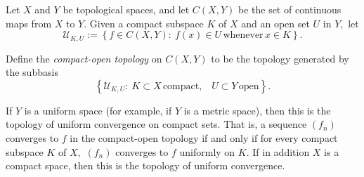\documentclass[12pt]{article}
\newcommand{\set}[1]{\left\{#1\right\}}
\newcommand{\seq}[1]{\left(#1\right)}
\begin{document}
\newcommand{\fU}{{\mathcal U}}
Let $X$ and $Y$ be topological spaces, and let $C(X,Y)$ be the set of continuous maps from $X$ to $Y.$ Given a compact subspace $K$ of $X$ and an open set $U$ in $Y,$ let 
\[
\fU_{K,U} := \set{f\in C(X,Y):\: f(x)\in U\, \text{whenever}\, x\in K}.
\]

Define the {\em compact-open topology} on $C(X,Y)$ to be the topology generated by the subbasis 
\[
\set{\fU_{K,U}:\: K\subset X\,\text{compact,}\quad U\subset Y\, \text{open} }.
\]

If $Y$ is a uniform space (for example, if $Y$ is a metric space), then this  is the topology of uniform convergence on compact sets. That is, a sequence $\seq{f_n}$ converges to $f$ in the compact-open topology if and only if for every compact subspace $K$ of $X,$ $\seq{f_n}$ converges to $f$ uniformly on $K$. If in addition $X$ is a compact space, then this is the topology of uniform convergence.
\end{document}
